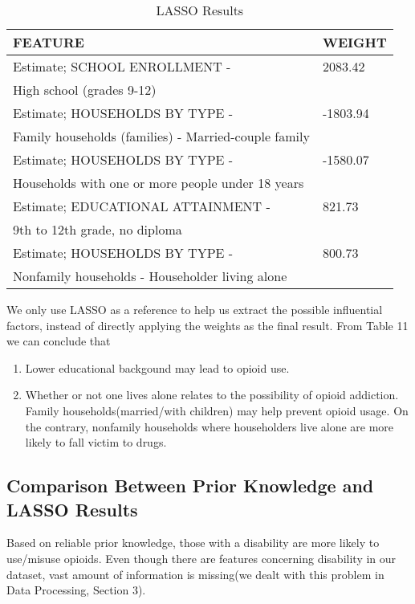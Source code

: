 \begin{table}[H]
	\centering
	\begin{tabular}{|l|l|}
		\hline
		\rowcolor[HTML]{656565} 
		{\color[HTML]{FFFFFF} \textbf{FEATURE}} & {\color[HTML]{FFFFFF} \textbf{WEIGHT}} \\ \hline
		
		Estimate; SCHOOL ENROLLMENT - 	&2083.42 \\ 
		High school (grades 9-12) & \\ \hline
		
		Estimate; HOUSEHOLDS BY TYPE - 	& -1803.94 \\
		Family households (families) - Married-couple family & \\ \hline
		Estimate; HOUSEHOLDS BY TYPE -  &	-1580.07  \\ Households with one or more people under 18 years &\\ \hline
		Estimate; EDUCATIONAL ATTAINMENT - 	& 821.73 \\ 
		9th to 12th grade, no diploma & \\ \hline
		Estimate; HOUSEHOLDS BY TYPE - & 	800.73 \\
		Nonfamily households - Householder living alone & \\ \hline
		
	\end{tabular}
	\centering
	\caption{LASSO Results}
\end{table}

We only use LASSO as a reference to help us extract the possible influential factors, instead of directly applying the weights as the final result. From Table 11 we can conclude that
\begin{enumerate}
	\item Lower educational backgound may lead to opioid use.
	\item Whether or not one lives alone relates to the possibility of opioid addiction. Family households(married/with children) may help prevent opioid usage. On the contrary, nonfamily households where householders live alone are more likely to fall victim to drugs.
\end{enumerate}

\subsection{Comparison Between Prior Knowledge and LASSO Results}
Based on reliable prior knowledge, those with a disability are more likely to use/misuse opioids. Even though there are features concerning disability in our dataset, vast amount of information is missing(we dealt with this problem in Data Processing, Section 3). 

